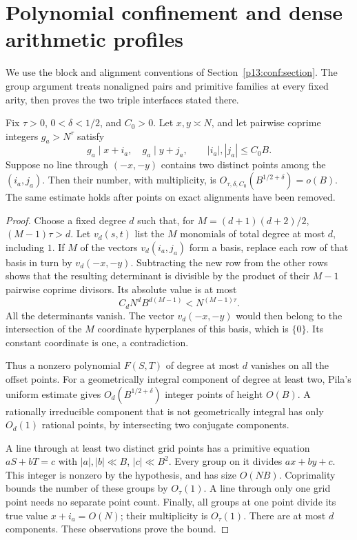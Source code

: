 \section{Polynomial confinement and dense arithmetic profiles}
\label{p14:comp:confinement}

We use the block and alignment conventions of
Section~\ref{p13:conf:section}. The group argument treats nonaligned
pairs and primitive families at every fixed arity, then proves the
two triple interfaces stated there.

\begin{lemma}
\label{p13:conf:groups}
Fix \(\tau>0\), \(0<\delta<1/2\), and \(C_0>0\).
Let \(x,y\asymp N\), and let pairwise coprime integers
\(g_a>N^\tau\) satisfy
\[
 g_a\mid x+i_a,\quad g_a\mid y+j_a,\qquad
 |i_a|,|j_a|\le C_0B.
\]
Suppose no line through \((-x,-y)\) contains two
distinct points among the \((i_a,j_a)\).
Then their number, with multiplicity, is
\(O_{\tau,\delta,C_0}(B^{1/2+\delta})=o(B)\).
The same estimate holds after points on exact alignments
have been removed.
\end{lemma}

\begin{proof}
Choose a fixed degree \(d\) such that, for
\(M=(d+1)(d+2)/2\), \((M-1)\tau>d\).
Let \(v_d(s,t)\) list the \(M\) monomials of total degree
at most \(d\), including \(1\).
If \(M\) of the vectors \(v_d(i_a,j_a)\) form a basis,
replace each row of that basis in turn by \(v_d(-x,-y)\).
Subtracting the new row from the other rows shows that
the resulting determinant is divisible by the product
of their \(M-1\) pairwise coprime divisors.
Its absolute value is at most
\[
 C_dN^dB^{d(M-1)}<N^{(M-1)\tau}.
\]
All the determinants vanish.
The vector \(v_d(-x,-y)\) would then belong to the
intersection of the \(M\) coordinate hyperplanes of
this basis, which is \(\{0\}\). Its constant coordinate
is one, a contradiction.

Thus a nonzero polynomial \(F(S,T)\) of degree at most
\(d\) vanishes on all the offset points.
For a geometrically integral component of degree at least
two, Pila's uniform estimate
\cite[Theorem~A]{pila1995} gives
\(O_d(B^{1/2+\delta})\) integer points of height \(O(B)\).
A rationally irreducible component that is not geometrically
integral has only \(O_d(1)\) rational points, by intersecting
two conjugate components.

A line through at least two distinct grid points has a
primitive equation \(aS+bT=c\) with
\(|a|,|b|\ll B\), \(|c|\ll B^2\).
Every group on it divides \(ax+by+c\).
This integer is nonzero by the hypothesis, and has size
\(O(NB)\). Coprimality bounds the number of these groups
by \(O_\tau(1)\). A line through only one grid point
needs no separate point count.
Finally, all groups at one point divide its true value
\(x+i_a=O(N)\); their multiplicity is \(O_\tau(1)\).
There are at most \(d\) components. These observations
prove the bound.
\end{proof}

